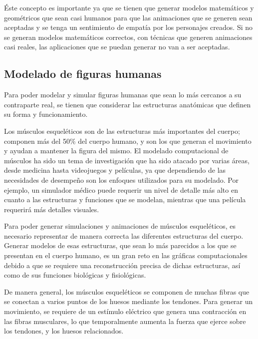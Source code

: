 Éste concepto es importante ya que se tienen que generar modelos matemáticos y geométricos que sean casi humanos para que las animaciones que se generen sean aceptadas y se tenga un sentimiento de empatía por los personajes creados. Si no se generan modelos matemáticos correctos, con técnicas que generen animaciones casi reales, las aplicaciones que se puedan generar no van a ser aceptadas. 

\subsection{Modelado de figuras humanas}

Para poder modelar y simular figuras humanas que sean lo más cercanos a su contraparte real, se tienen que considerar las estructuras anatómicas que definen su forma y funcionamiento. 

Los músculos esqueléticos son de las estructuras más importantes del cuerpo; componen más del 50\% del cuerpo humano, y son los que generan el movimiento y ayudan a mantener la figura del mismo. El modelado computacional de músculos ha sido un tema de investigación que ha sido atacado por varias áreas, desde medicina hasta videojuegos y películas, ya que dependiendo de las necesidades de desempeño son los enfoques utilizados para su modelado. Por ejemplo, un simulador médico puede requerir un nivel de detalle más alto en cuanto a las estructuras y funciones que se modelan, mientras que una película requerirá más detalles visuales. 

Para poder generar simulaciones y animaciones de músculos esqueléticos, es necesario representar de manera correcta las diferentes estructuras del cuerpo. Generar modelos de esas estructuras, que sean lo más parecidos a los que se presentan en el cuerpo humano, es un gran reto en las gráficas computacionales debido a que se requiere una reconstrucción precisa de dichas estructuras, así como de sus funciones biológicas y fisiológicas. 

De manera general, los músculos esqueléticos se componen de muchas fibras que se conectan a varios puntos de los huesos mediante los tendones. Para generar un movimiento, se requiere de un estímulo eléctrico que genera una contracción en las fibras musculares, lo que temporalmente aumenta la fuerza que ejerce sobre los tendones, y los huesos relacionados.

